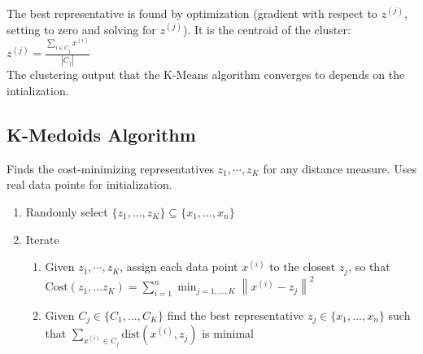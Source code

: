The best representative is found by optimization (gradient with respect to $z^{(j)}$, setting to zero and solving for $z^{(j)}$). It is the centroid of the cluster: $z^{(j)}=\displaystyle \frac{\sum _{i \in C_ j} x^{(i)}}{|C_ j|}$\\

The clustering output that the K-Means algorithm converges to depends on the intialization.

\subsection{K-Medoids Algorithm}

Finds the cost-minimizing representatives  $z_1,\cdots,z_K$ for any distance measure. Uses real data points for initialization.

\begin{enumerate}
\item Randomly select $\big \{  z_1, ..., z_ K \big \}  \subseteq \big \{  x_1, ..., x_ n \big \}$
\item Iterate
\begin{enumerate}
\item Given $z_1,\cdots,z_K$, assign each data point $x^{(i)}$ to the closest $z_j$, so that $\text {Cost}(z_1, ... z_ K) = \sum _{i=1}^{n} \min _{j=1,...,K} \left\|  x^{(i)} - z_ j \right\| ^2$
\item Given $C_ j \in \big \{ C_1,...,C_ K\big \}$ find the best representative $z_ j \in \big \{ x_1,...,x_ n\big \}$ such that $\sum _{x^{(i)} \in C_ j} \text {dist}(x^{(i)}, z_ j)$ is minimal
\end{enumerate}
\end{enumerate}